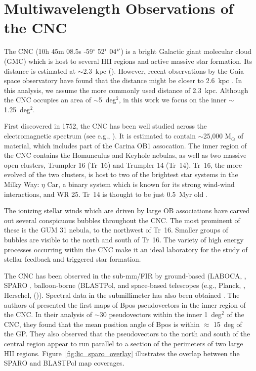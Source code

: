 \section{Multiwavelength Observations of the CNC}\label{multiband comp}

The CNC (10h 45m 08.5s -59$^{\circ}$ 52$\operatorname{^{\prime}}$ 04$\operatorname{^{\prime\prime}}$) is a bright Galactic giant molecular cloud (GMC) which is host to several HII regions and active massive star formation. Its distance is estimated at $\sim$2.3~kpc (\citet{allen1993shape,smith2006structure}). However, recent observations by the Gaia space observatory have found that the distance might be closer to 2.6~kpc \citep{davidson2018gaia}. In this analysis, we assume the more commonly used distance of 2.3~kpc. Although the CNC occupies an area of $\sim$5~deg$^{2}$, in this work we focus on the inner $\sim$1.25~deg$^{2}$.

First discovered in 1752, the CNC has been well studied across the electromagnetic spectrum (see e.g., \citet{smith2008carina}). It is estimated to contain $\sim$25,000 M$_{\odot}$ of material, which includes part of the Carina OB1 assocation. The inner region of the CNC contains the Homunculus and Keyhole nebulas, as well as two massive open clusters, Trumpler 16 (Tr~16) and Trumpler 14 (Tr~14). Tr~16, the more evolved of the two clusters, is host to two of the brightest star systems in the Milky Way: $\eta$ Car, a binary system which is known for its strong wind-wind interactions, and WR 25. Tr~14 is thought to be just 0.5~Myr old \citep{preibisch2011hawk}.

The ionizing stellar winds which are driven by large OB associations have carved out several conspicuous bubbles throughout the CNC. The most prominent of these is the GUM 31 nebula, to the northwest of Tr~16. Smaller groups of bubbles are visible to the north and south of Tr~16. The variety of high energy processes occurring within the CNC make it an ideal laboratory for the study of stellar feedback and triggered star formation.

The CNC has been observed in the sub-mm/FIR by ground-based (LABOCA, \citep{preibisch2011laboca}, SPARO \citep{li2006results}, balloon-borne (BLASTPol, \citep{shariff2019submillimeter} and space-based telescopes (e.g., Planck, \citep{planck2014planck}, Herschel, (\citet{preibisch2012herschel,gaczkowski2013herschel,roccatagliata2013herschel})). Spectral data in the submillimeter has also been obtained \citep{oberst2006detection}. The authors of \citet{li2006results} presented the first maps of \gls{Bpos} pseudovectors in the inner region of the CNC. In their analysis of $\sim$30 pseudovectors within the inner 1~deg$^{2}$ of the CNC, they found that the mean position angle of \gls{Bpos} is within $\approx$ 15~deg of the GP. They also observed that the pseudovectors to the north and south of the central region appear to run parallel to a section of the perimeters of two large HII regions. Figure~\ref{fig:lic_sparo_overlay} illustrates the overlap between the SPARO and BLASTPol map coverages.

